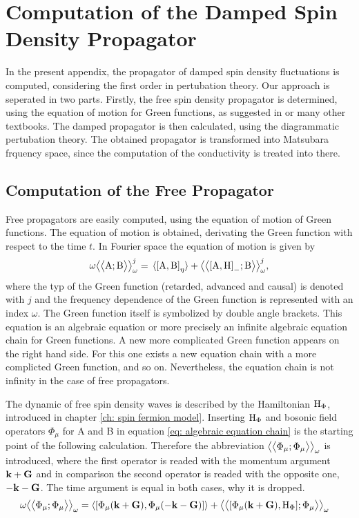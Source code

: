 %
%
%
\chapter{Computation of the Damped Spin Density Propagator}
\label{appch:propagator}
%
%
%
In the present appendix, the propagator of damped spin density fluctuations is computed, considering the first order in pertubation theory.
Our approach is seperated in two parts.
Firstly, the free spin density propagator is determined, using the equation of motion for Green functions, as suggested in \cite{Elk&Gasser} or many other textbooks.
The damped propagator is then calculated, using the diagrammatic pertubation theory.
The obtained propagator is transformed into Matsubara frquency space, since the computation of the conductivity is treated into there.
%
%
\section{Computation of the Free Propagator}
\label{sec:free propagator}
%
%
Free propagators are easily computed, using the equation of motion of Green functions.
The equation of motion is obtained, derivating the Green function with respect to the time $t$.
In Fourier space the equation of motion is given by
%
\begin{align}
	\omega \green{\mt{A}}{\mt{B}}_{\omega}^{j} = \expval*{\comm{\mt{A}}{\mt{B}}_{\eta}} + \green{\comm{\mt{A}}{\mt{H}}_{-}}{\mt{B}}_{\omega}^{j},
	\label{eq: algebraic equation chain}
\end{align}
%
where the typ of the Green function (retarded, advanced and causal) is denoted with $j$ and the frequency dependence of the Green function is represented with an index $\omega$.
The Green function itself is symbolized by double angle brackets.
This equation is an algebraic equation or more precisely an infinite algebraic equation chain for Green functions.
A new more complicated Green function appears on the right hand side.
For this one exists a new equation chain with a more complicted Green function, and so on.
Nevertheless, the equation chain is not infinity in the case of free propagators.

The dynamic of free spin density waves is described by the Hamiltonian $\mathrm{H}_{\Phi}$, introduced in chapter \ref{ch: spin fermion model}.
Inserting $\mathrm{H}_{\Phi}$ and bosonic field operators $\Phi_{\mu}$ for A and B in equation \eqref{eq: algebraic equation chain} is the starting point of the following calculation.
Therefore the abbreviation $\big\langle\big\langle{\Phi_{\mu}};{\Phi_{\mu}}\big\rangle\big\rangle_{\omega}$ is introduced, where the first operator is readed with the momentum argument $\vb{k}+\vb{G}$ and in comparison the second operator is readed with the opposite one, $-\vb{k}-\vb{G}$.
The time argument is equal in both cases, why it is dropped.
%
\begin{align}
	\omega \green{\Phi_{\mu}}{\Phi_{\mu}}_{\omega} &= 
		\expval{\comm{\Phi_{\mu}(\vb{k}+\vb{G})}{\Phi_{\mu}(-\vb{k}-\vb{G})}}
		+
		\green{\comm{\Phi_{\mu}(\vb{k}+\vb{G})}{\mt{H}_{\Phi}}}{\Phi_{\mu}}_{\omega}
		\label{eq: equation chain SDW}
\end{align}
%

